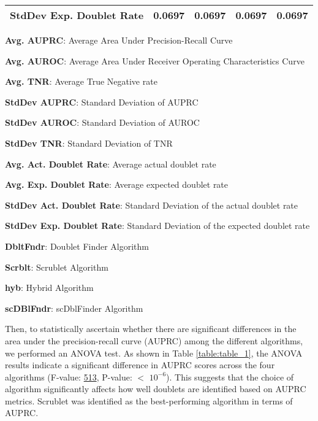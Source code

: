 \documentclass[11pt]{article}
\begin{document}
\begin{table}[h]
\begin{threeparttable}
{\begin{tabular}{lrrrr}
\textbf{StdDev Exp. Doublet Rate} & \raisebox{2ex}{\hypertarget{A9a}{}}0.0697 & \raisebox{2ex}{\hypertarget{A9b}{}}0.0697 & \raisebox{2ex}{\hypertarget{A9c}{}}0.0697 & \raisebox{2ex}{\hypertarget{A9d}{}}0.0697 \\
\bottomrule
\end{tabular}}
\begin{tablenotes}
\footnotesize
\item \textbf{Avg. AUPRC}: Average Area Under Precision-Recall Curve
\item \textbf{Avg. AUROC}: Average Area Under Receiver Operating Characteristics Curve
\item \textbf{Avg. TNR}: Average True Negative rate
\item \textbf{StdDev AUPRC}: Standard Deviation of AUPRC
\item \textbf{StdDev AUROC}: Standard Deviation of AUROC
\item \textbf{StdDev TNR}: Standard Deviation of TNR
\item \textbf{Avg. Act. Doublet Rate}: Average actual doublet rate
\item \textbf{Avg. Exp. Doublet Rate}: Average expected doublet rate
\item \textbf{StdDev Act. Doublet Rate}: Standard Deviation of the actual doublet rate
\item \textbf{StdDev Exp. Doublet Rate}: Standard Deviation of the expected doublet rate
\item \textbf{DbltFndr}: Doublet Finder Algorithm
\item \textbf{Scrblt}: Scrublet Algorithm
\item \textbf{hyb}: Hybrid Algorithm
\item \textbf{scDBlFndr}: scDblFinder Algorithm
\end{tablenotes}
\end{threeparttable}
\end{table}

Then, to statistically ascertain whether there are significant differences in the area under the precision-recall curve (AUPRC) among the different algorithms, we performed an ANOVA test. As shown in Table \ref{table:table_1}, the ANOVA results indicate a significant difference in AUPRC scores across the four algorithms (F-value: \hyperlink{B0a}{513}, P-value: $<$ \hyperlink{B0b}{$10^{-6}$}). This suggests that the choice of algorithm significantly affects how well doublets are identified based on AUPRC metrics. Scrublet was identified as the best-performing algorithm in terms of AUPRC.
\end{document}
